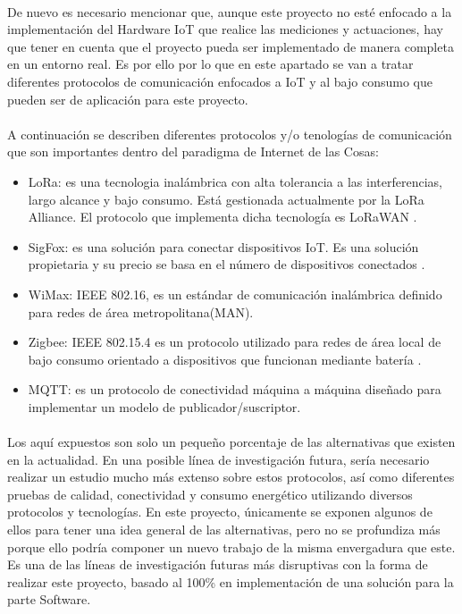 \documentclass[../../memoria.tex]{subfiles}
\begin{document}
\paragraph{}
De nuevo es necesario mencionar que, aunque este proyecto no esté enfocado a la implementación del Hardware IoT que realice las mediciones y actuaciones, hay que tener en cuenta que el proyecto pueda ser implementado de manera completa en un entorno real. Es por ello por lo que en este apartado se van a tratar diferentes protocolos de comunicación enfocados a IoT y al bajo consumo que pueden ser de aplicación para este proyecto.

\paragraph{}
A continuación se describen diferentes protocolos y/o tenologías de comunicación que son importantes dentro del paradigma de Internet de las Cosas:

\begin{itemize}
    \item LoRa: es una tecnologia inalámbrica con alta tolerancia a las interferencias, largo alcance y bajo consumo. Está gestionada actualmente por la LoRa Alliance. El protocolo que implementa dicha tecnología es LoRaWAN \cite{lora} \cite{loratech}.

    \item SigFox: es una solución para conectar dispositivos IoT. Es una solución propietaria y su precio se basa en el número de dispositivos conectados \cite{sigfox}.

    \item WiMax: IEEE 802.16, es un estándar de comunicación inalámbrica definido para redes de área metropolitana(MAN). \cite{wimax}

    \item Zigbee: IEEE 802.15.4 es un protocolo utilizado para redes de área local de bajo consumo orientado a dispositivos que funcionan mediante batería \cite{zigbee}.

    \item MQTT: es un protocolo de conectividad máquina a máquina diseñado para implementar un modelo de publicador/suscriptor. \cite{mqtt}
\end{itemize}

\paragraph{}
Los aquí expuestos son solo un pequeño porcentaje de las alternativas que existen en la actualidad. En una posible línea de investigación futura, sería necesario realizar un estudio mucho más extenso sobre estos protocolos, así como diferentes pruebas de calidad, conectividad y consumo energético utilizando diversos protocolos y tecnologías. En este proyecto, únicamente se exponen algunos de ellos para tener una idea general de las alternativas, pero no se profundiza más porque ello podría componer un nuevo trabajo de la misma envergadura que este. Es una de las líneas de investigación futuras más disruptivas con la forma de realizar este proyecto, basado al 100\% en implementación de una solución para la parte Software.
\end{document}
